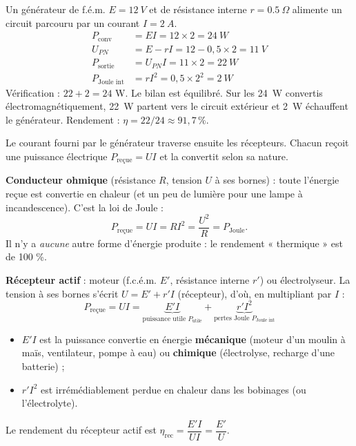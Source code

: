 \documentclass[11pt]{article}
\newcounter{popsec}
\newcounter{popsub}
\newcommand{\courssub}[1]{%
  \stepcounter{popsub}%
  \par\vspace{9pt}\noindent{\popxbold\fontsize{11.5}{13}\selectfont\color{popink}{\color{poporange}\thepopsec.\thepopsub}\hspace{6pt}#1}\par\nopagebreak\vspace{4pt}
}
\begin{document}
\begin{exemplebox}
Un générateur de f.é.m. $E = \SI{12}{V}$ et de résistance interne $r = \SI{0,5}{\Omega}$ alimente un circuit parcouru par un courant $I = \SI{2}{A}$.
\begin{align*}
P_{\text{conv}} &= EI = 12 \times 2 = \SI{24}{W} \\
U_{PN} &= E - rI = 12 - 0{,}5 \times 2 = \SI{11}{V} \\
P_{\text{sortie}} &= U_{PN}I = 11 \times 2 = \SI{22}{W} \\
P_{\text{Joule int}} &= rI^2 = 0{,}5 \times 2^2 = \SI{2}{W}
\end{align*}
Vérification : $22 + 2 = 24$ W. Le bilan est équilibré. Sur les \SI{24}{W} convertis électromagnétiquement, \SI{22}{W} partent vers le circuit extérieur et \SI{2}{W} échauffent le générateur. Rendement : $\eta = 22/24 \approx 91,7\,\%$.
\end{exemplebox}

\courssub{Le bilan des récepteurs}

Le courant fourni par le générateur traverse ensuite les récepteurs. Chacun reçoit une puissance électrique $P_{\text{reçue}} = UI$ et la convertit selon sa nature.

\textbf{Conducteur ohmique} (résistance $R$, tension $U$ à ses bornes) : toute l'énergie reçue est convertie en chaleur (et un peu de lumière pour une lampe à incandescence). C'est la loi de Joule :
\[ P_{\text{reçue}} = UI = RI^2 = \frac{U^2}{R} = P_{\text{Joule}}. \]
Il n'y a \emph{aucune} autre forme d'énergie produite : le rendement « thermique » est de 100 \%.

\textbf{Récepteur actif} : moteur (f.c.é.m. $E'$, résistance interne $r'$) ou électrolyseur. La tension à ses bornes s'écrit $U = E' + r'I$ (récepteur), d'où, en multipliant par $I$ :
\[ \boxed{P_{\text{reçue}} = UI = \underbrace{E'I}_{\text{puissance utile } P_{\text{utile}}} + \underbrace{r'I^2}_{\text{pertes Joule } P_{\text{Joule int}}}} \]
\begin{itemize}
\item $E'I$ est la puissance convertie en énergie \textbf{mécanique} (moteur d'un moulin à maïs, ventilateur, pompe à eau) ou \textbf{chimique} (électrolyse, recharge d'une batterie) ;
\item $r'I^2$ est irrémédiablement perdue en chaleur dans les bobinages (ou l'électrolyte).
\end{itemize}
Le rendement du récepteur actif est $\eta_{\text{rec}} = \dfrac{E'I}{UI} = \dfrac{E'}{U}$.
\end{document}
